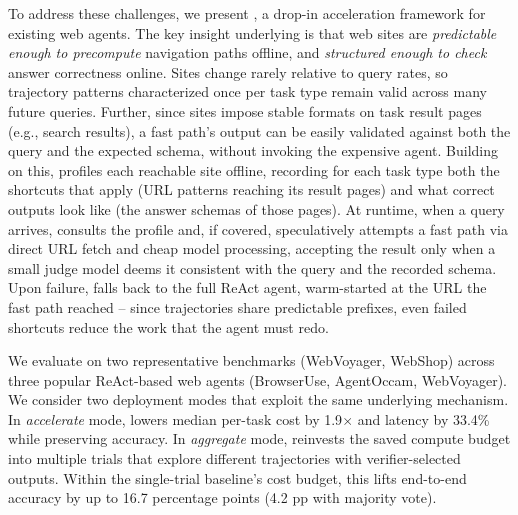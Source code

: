 To address these challenges, we present \textbf{\sys}, a drop-in acceleration framework for existing web agents. The key insight underlying \sys{} is that web sites are \emph{predictable enough to precompute} navigation paths offline, and \emph{structured enough to check} answer correctness online. Sites change rarely relative to query rates, so trajectory patterns characterized once per task type remain valid across many future queries. Further, since sites impose stable formats on task result pages (e.g., search results), a fast path's output can be easily validated against both the query and the expected schema, without invoking the expensive agent. Building on this, \sys{} profiles each reachable site offline, recording for each task type both the shortcuts that apply (URL patterns reaching its result pages) and what correct outputs look like (the answer schemas of those pages). At runtime, when a query arrives, \sys{} consults the profile and, if covered, speculatively attempts a fast path via direct URL fetch and cheap model processing, accepting the result only when a small judge model deems it consistent with the query and the recorded schema. Upon failure, \sys{} falls back to the full ReAct agent, warm-started at the URL the fast path reached -- since trajectories share predictable prefixes, even failed shortcuts reduce the work that the agent must redo.






We evaluate \sys on two representative benchmarks (WebVoyager, WebShop) across three popular ReAct-based web agents (BrowserUse, AgentOccam, WebVoyager). We consider two deployment modes that exploit the same underlying mechanism. In \emph{accelerate} mode, \sys lowers median per-task cost by 1.9$\times$ and latency by 33.4\% while preserving accuracy. In \emph{aggregate} mode, \sys reinvests the saved compute budget into multiple trials that explore different trajectories with verifier-selected outputs. Within the single-trial baseline's cost budget, this lifts end-to-end accuracy by up to 16.7 percentage points (4.2 pp with majority vote).

